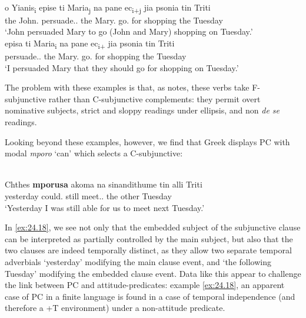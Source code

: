 \documentclass[output=paper]{langsci/langscibook}
\begin{document}
\ea%
    \label{ex:24.16}\\
	\gll o Yianis\textsubscript{i}       epise         ti Maria\textsubscript{j}       na     pane ec\textsubscript{i+j} jia psonia tin Triti\\
		the John.\Nom{}   persuade.\Tsg.\Pst{}    the Mary.\Acc{}    \Sbjv{} go.\Tpl{} {} for shopping the Tuesday\\
	\glt ‘John persuaded Mary to go (John and Mary) shopping on Tuesday.’
\ex%
    \label{ex:24.17}  \parencite[(34a), ((35a)]{Spyropoulos2007b}\\
	\gll episa       ti Maria\textsubscript{i}   na   pane ec\textsubscript{i+}   jia psonia tin Triti\\
        persuade.\Fsg{}.\Pst{}   the Mary.\Acc{} \Sbjv{} go.\Tpl{} {}  for shopping the Tuesday\\
	\glt ‘I persuaded Mary that they should go for shopping on Tuesday.’\\
\z

The problem with these examples is that, as \citet{Varlokosta1994} notes, these
verbs take F-subjunctive rather than C-subjunctive complements: they permit
overt nominative subjects, strict and sloppy readings under
ellipsis, and non \emph{de se} readings.

Looking beyond these examples, however, we find that Greek displays
\gls{PC} with modal \emph{mporo} ‘can’ which
selects a C-subjunctive:

\ea%
    \label{ex:24.18} \\
	\gll Chthes   \textbf{mporusa}  akoma na     sinandithume tin alli Triti\\
        yesterday  could.\Fsg{}  still     \Sbjv{} meet.\Sbjv{}.\Fpl{}  the other Tuesday\\
	\glt ‘Yesterday I was still able for us to meet next Tuesday.’
\z

In \eqref{ex:24.18}, we see not only that the embedded subject of the subjunctive clause
can be interpreted as partially controlled by the main subject, but also that
the two clauses are indeed temporally distinct, as they allow two separate
temporal adverbials `yesterday' modifying the main clause event, and `the
following Tuesday' modifying the embedded clause event. Data like this appear
to challenge the link between \gls{PC} and
attitude-predicates: example \eqref{ex:24.18}, an apparent case of
\gls{PC} in a finite  language is found in a
case of temporal independence (and therefore a +T environment) under a
non-attitude predicate.
\end{document}
